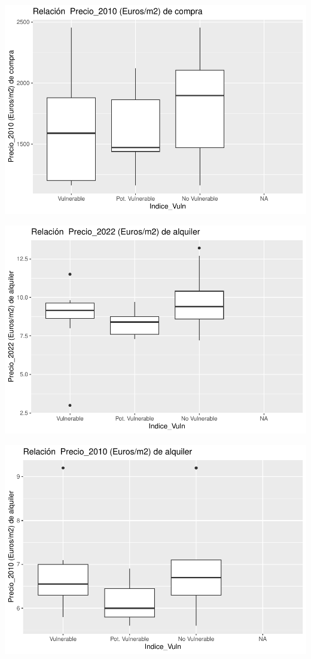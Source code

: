 \documentclass[notspecified,article,submit,moreauthors,pdftex]{Definitions/mdpi}
\begin{document}
\begin{center}\includegraphics{./figure/unnamed-chunk-23-14} \end{center}

\begin{center}\includegraphics{./figure/unnamed-chunk-23-15} \end{center}

\begin{center}\includegraphics{./figure/unnamed-chunk-23-16} \end{center}
\end{document}
